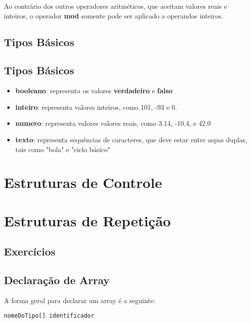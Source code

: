 \documentclass{report}
\begin{document}
Ao contrário dos outros operadores aritméticos, que aceitam
valores reais e inteiros, o operador \textbf{mod} somente pode
ser aplicado a operandos inteiros. 


\section{Tipos Básicos}


\section{Tipos Básicos}

\begin{itemize}
	\item \textbf{booleano}: representa os valores \textbf{verdadeiro} e \textbf{falso}
	\item \textbf{inteiro}: representa valores inteiros, como 101, -93 e 0.
	\item \textbf{numero}: representa valores valores reais, como 3.14, -10.4, e 42.0
	\item \textbf{texto}: representa sequências de caracteres, que deve estar entre
  aspas duplas, tais como "bola" e "ciclo básico"
\end{itemize}





\chapter{Estruturas de Controle}

\chapter{Estruturas de Repetição}



\section{Exercícios}




\section{Declaração de Array}

A forma geral para declarar um array é a seguinte: 
\begin{verbatim}
nomeDoTipo[] identificador
\end{verbatim}
\end{document}
